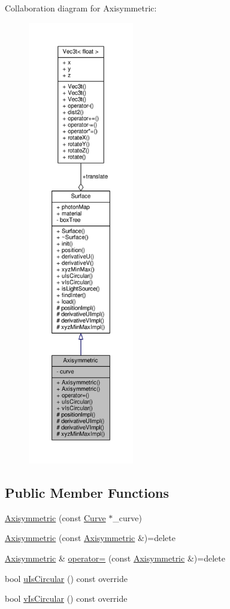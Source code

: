 Collaboration diagram for Axisymmetric\+:
\nopagebreak
\begin{figure}[H]
\begin{center}
\leavevmode
\includegraphics[height=550pt]{classAxisymmetric__coll__graph}
\end{center}
\end{figure}
\subsection*{Public Member Functions}
\begin{DoxyCompactItemize}
\item 
\hyperlink{classAxisymmetric_ab9470bf0bc24964f1c8b186d9e900036}{Axisymmetric} (const \hyperlink{classCurve}{Curve} $\ast$\+\_\+curve)
\item 
\hyperlink{classAxisymmetric_a3a9d954abfcb1bbb524382c9d64ae412}{Axisymmetric} (const \hyperlink{classAxisymmetric}{Axisymmetric} \&)=delete
\item 
\hyperlink{classAxisymmetric}{Axisymmetric} \& \hyperlink{classAxisymmetric_ab788a7e5b1f41fb28a128489cb0312d0}{operator=} (const \hyperlink{classAxisymmetric}{Axisymmetric} \&)=delete
\item 
bool \hyperlink{classAxisymmetric_a50b489a9914ad852638b586cc0c6c2dc}{u\+Is\+Circular} () const override
\item 
bool \hyperlink{classAxisymmetric_a63d63250b3ca2a34c2707abf35169657}{v\+Is\+Circular} () const override
\end{DoxyCompactItemize}
